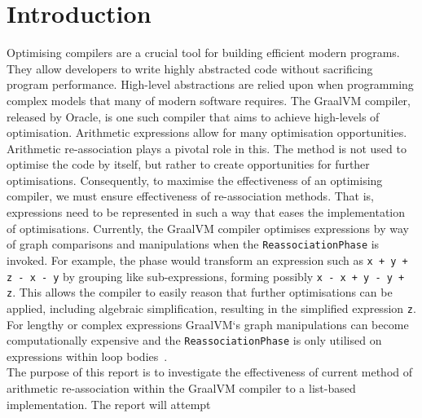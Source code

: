 \documentclass[12pt,openany,a4paper]{book}
\begin{document}
\cleardoublepage

\mainmatter


%
%
%
%	
%	

\chapter{Introduction}
\label{intro}

Optimising compilers are a crucial tool for building efficient 
modern programs. They allow developers to write highly abstracted code without 
sacrificing program performance. High-level abstractions are relied upon when
programming complex models that many of modern software requires. The GraalVM
compiler, released by Oracle, is one such compiler that aims to achieve 
high-levels of optimisation. Arithmetic expressions allow for many optimisation opportunities.
Arithmetic re-association plays a pivotal role in this. The method is not used
to optimise the code by itself, but rather to create opportunities for further
optimisations. Consequently, to maximise the effectiveness of an optimising
compiler, we must ensure effectiveness of re-association methods. That is,
expressions need to be represented in such a way that eases the implementation
of optimisations.
Currently, the GraalVM compiler optimises expressions by way 
of graph comparisons and manipulations when the \verb|ReassociationPhase| is invoked.
For example, the phase would transform an expression such as \verb|x + y + z - x - y|
by grouping like sub-expressions, forming possibly \verb|x - x + y - y + z|. This
allows the compiler to easily reason that further optimisations can be applied, 
including algebraic simplification, resulting in the simplified expression \verb|z|.
For lengthy or complex expressions GraalVM`s graph manipulations can become computationally 
expensive and the \verb|ReassociationPhase| is only utilised on expressions within
loop bodies~\cite{graalsrc}.\\
The purpose of this report is to investigate the effectiveness of current method
of arithmetic re-association within the GraalVM compiler to a list-based
implementation. The report will attempt
\end{document}
